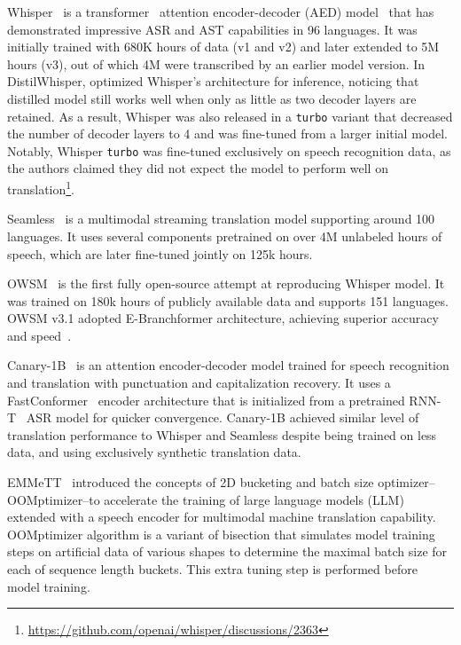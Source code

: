 \documentclass[11pt]{article}
\begin{document}
Whisper~\cite{radford2022robustspeechrecognitionlargescale} is a transformer~\cite{vaswani2017attention} attention encoder-decoder (AED) model~\cite{bahdanau2015neural} that has demonstrated impressive ASR and AST capabilities in 96 languages. 
It was initially trained with 680K hours of data (v1 and v2) and later extended to 5M hours (v3), out of which 4M were transcribed by an earlier model version. 
In DistilWhisper, \citet{gandhi2023distilwhisperrobustknowledgedistillation} optimized Whisper's architecture for inference, noticing that distilled model still works well when only as little as two decoder layers are retained.
As a result, Whisper was also released in a \texttt{turbo} variant that decreased the number of decoder layers to 4 and was fine-tuned from a larger initial model. Notably, Whisper \texttt{turbo} was fine-tuned exclusively on speech recognition data, as the authors claimed they did not expect the model to perform well on translation\footnote{\url{https://github.com/openai/whisper/discussions/2363}}. 

Seamless~\cite{barrault2023seamless} is a multimodal streaming translation model supporting around 100 languages. It uses several components pretrained on over 4M unlabeled hours of speech, which are later fine-tuned jointly on 125k hours.

OWSM~\cite{peng2023reproducing} is the first fully open-source attempt at reproducing  Whisper model. It was trained on 180k hours of publicly available data and supports 151 languages. OWSM v3.1 adopted E-Branchformer architecture, achieving superior accuracy and speed~\cite{peng2024owsm}.

Canary-1B~\cite{puvvada24_interspeech} is an attention encoder-decoder model trained for speech recognition and translation with punctuation and capitalization recovery. It uses a FastConformer~\cite{rekesh2023fast} encoder architecture that is initialized from a pretrained RNN-T~\cite{graves2012sequencetransductionrecurrentneural} ASR model for quicker convergence. 
Canary-1B achieved similar level of translation performance to Whisper and Seamless despite being trained on less data, and using exclusively synthetic translation data.

EMMeTT~\cite{zelasko2024emmett} introduced the concepts of 2D bucketing and batch size optimizer--OOMptimizer--to accelerate the training of large language models (LLM) extended with a speech encoder for multimodal machine translation capability. 
OOMptimizer algorithm is a variant of bisection that simulates model training steps on artificial data of various shapes to determine the maximal batch size for each of sequence length buckets.
This extra tuning step is performed before model training.
\end{document}
